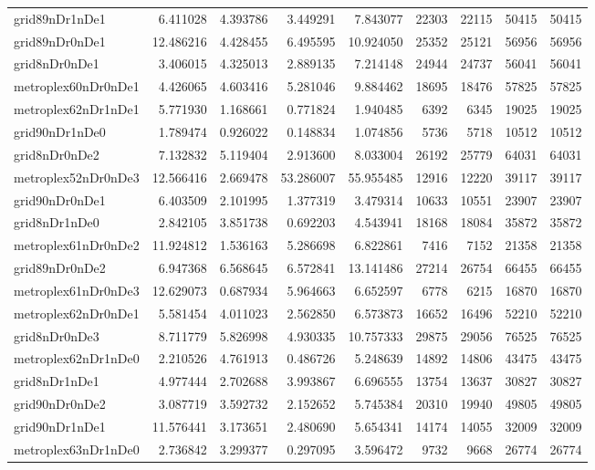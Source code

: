 \begin{longtable}{|l|r|r|r|r|r|r|r|r|}
grid89nDr1nDe1 & 6.411028 & 4.393786 & 3.449291 & 7.843077 & 22303 & 22115 & 50415 & 50415 \\
grid89nDr0nDe1 & 12.486216 & 4.428455 & 6.495595 & 10.924050 & 25352 & 25121 & 56956 & 56956 \\
grid8nDr0nDe1 & 3.406015 & 4.325013 & 2.889135 & 7.214148 & 24944 & 24737 & 56041 & 56041 \\
metroplex60nDr0nDe1 & 4.426065 & 4.603416 & 5.281046 & 9.884462 & 18695 & 18476 & 57825 & 57825 \\
metroplex62nDr1nDe1 & 5.771930 & 1.168661 & 0.771824 & 1.940485 & 6392 & 6345 & 19025 & 19025 \\
grid90nDr1nDe0 & 1.789474 & 0.926022 & 0.148834 & 1.074856 & 5736 & 5718 & 10512 & 10512 \\
grid8nDr0nDe2 & 7.132832 & 5.119404 & 2.913600 & 8.033004 & 26192 & 25779 & 64031 & 64031 \\
metroplex52nDr0nDe3 & 12.566416 & 2.669478 & 53.286007 & 55.955485 & 12916 & 12220 & 39117 & 39117 \\
grid90nDr0nDe1 & 6.403509 & 2.101995 & 1.377319 & 3.479314 & 10633 & 10551 & 23907 & 23907 \\
grid8nDr1nDe0 & 2.842105 & 3.851738 & 0.692203 & 4.543941 & 18168 & 18084 & 35872 & 35872 \\
metroplex61nDr0nDe2 & 11.924812 & 1.536163 & 5.286698 & 6.822861 & 7416 & 7152 & 21358 & 21358 \\
grid89nDr0nDe2 & 6.947368 & 6.568645 & 6.572841 & 13.141486 & 27214 & 26754 & 66455 & 66455 \\
metroplex61nDr0nDe3 & 12.629073 & 0.687934 & 5.964663 & 6.652597 & 6778 & 6215 & 16870 & 16870 \\
metroplex62nDr0nDe1 & 5.581454 & 4.011023 & 2.562850 & 6.573873 & 16652 & 16496 & 52210 & 52210 \\
grid8nDr0nDe3 & 8.711779 & 5.826998 & 4.930335 & 10.757333 & 29875 & 29056 & 76525 & 76525 \\
metroplex62nDr1nDe0 & 2.210526 & 4.761913 & 0.486726 & 5.248639 & 14892 & 14806 & 43475 & 43475 \\
grid8nDr1nDe1 & 4.977444 & 2.702688 & 3.993867 & 6.696555 & 13754 & 13637 & 30827 & 30827 \\
grid90nDr0nDe2 & 3.087719 & 3.592732 & 2.152652 & 5.745384 & 20310 & 19940 & 49805 & 49805 \\
grid90nDr1nDe1 & 11.576441 & 3.173651 & 2.480690 & 5.654341 & 14174 & 14055 & 32009 & 32009 \\
metroplex63nDr1nDe0 & 2.736842 & 3.299377 & 0.297095 & 3.596472 & 9732 & 9668 & 26774 & 26774 \\

\end{longtable}

